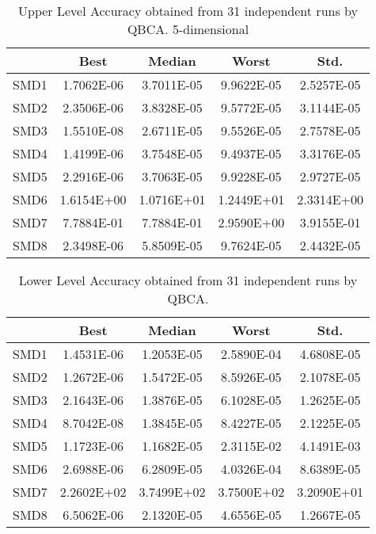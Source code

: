 \documentclass[conference]{IEEEtran}
\theoremstyle{definition}
\begin{document}
\begin{table}[htbp]
    \caption{Upper Level Accuracy obtained from 31 independent runs by QBCA. 5-dimensional}
    \label{tab:ul-accur-5}
    \centering
    \begin{tabular}{ccccc}
        \hline
             & Best &  Median  &  Worst &  Std. \\ \hline
        SMD1 & 1.7062E-06 & 3.7011E-05 & 9.9622E-05 & 2.5257E-05 \\ \hline 
        SMD2 & 2.3506E-06 & 3.8328E-05 & 9.5772E-05 & 3.1144E-05 \\ \hline 
        SMD3 & 1.5510E-08 & 2.6711E-05 & 9.5526E-05 & 2.7578E-05 \\ \hline 
        SMD4 & 1.4199E-06 & 3.7548E-05 & 9.4937E-05 & 3.3176E-05 \\ \hline 
        SMD5 & 2.2916E-06 & 3.7063E-05 & 9.9228E-05 & 2.9727E-05 \\ \hline 
        SMD6 & 1.6154E+00 & 1.0716E+01 & 1.2449E+01 & 2.3314E+00 \\ \hline 
        SMD7 & 7.7884E-01 & 7.7884E-01 & 2.9590E+00 & 3.9155E-01 \\ \hline 
        SMD8 & 2.3498E-06 & 5.8509E-05 & 9.7624E-05 & 2.4432E-05 \\ \hline 
 
    \end{tabular}
\end{table}

\begin{table}[htbp]
    \caption{Lower Level Accuracy obtained from 31 independent runs by QBCA.}
    \label{tab:ll-accur}
    \centering
    \begin{tabular}{ccccc}
        \hline
        & Best &  Median  &  Worst &  Std. \\ \hline

        SMD1 & 1.4531E-06 & 1.2053E-05 %
        & 2.5890E-04 & 4.6808E-05 \\ \hline 
        SMD2 & 1.2672E-06 & 1.5472E-05 %
        & 8.5926E-05 & 2.1078E-05 \\ \hline 
        SMD3 & 2.1643E-06 & 1.3876E-05 %
        & 6.1028E-05 & 1.2625E-05 \\ \hline 
        SMD4 & 8.7042E-08 & 1.3845E-05 %
        & 8.4227E-05 & 2.1225E-05 \\ \hline 
        SMD5 & 1.1723E-06 & 1.1682E-05 %
        & 2.3115E-02 & 4.1491E-03 \\ \hline 
        SMD6 & 2.6988E-06 & 6.2809E-05 %
        & 4.0326E-04 & 8.6389E-05 \\ \hline 
        SMD7 & 2.2602E+02 & 3.7499E+02 %
        & 3.7500E+02 & 3.2090E+01 \\ \hline 
        SMD8 & 6.5062E-06 & 2.1320E-05 %
        & 4.6556E-05 & 1.2667E-05 \\ \hline 

    \end{tabular}
\end{table}
\end{document}
